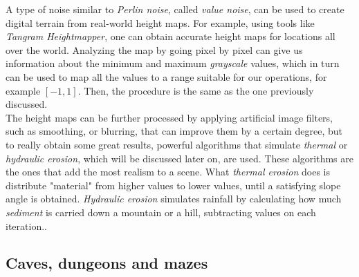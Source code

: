 A type of noise similar to \textit{Perlin noise}, called \textit{value noise}, can be used to create digital terrain from real-world height maps. For example, using tools like \textit{Tangram Heightmapper}, one can obtain accurate height maps for locations all over the world. Analyzing the map by going pixel by pixel can give us information about the minimum and maximum \textit{grayscale} values, which in turn can be used to map all the values to a range suitable for our operations, for example \([-1, 1]\). Then, the procedure is the same as the one previously discussed\cite{parberry2014designer}.\\

The height maps can be further processed by applying artificial image filters, such as smoothing, or blurring, that can improve them by a certain degree, but to really obtain some great results, powerful algorithms that simulate \textit{thermal} or \textit{hydraulic erosion}, which will be discussed later on, are used. These algorithms are the ones that add the most realism to a scene. What \textit{thermal erosion} does is distribute "material" from higher values to lower values, until a satisfying slope angle is obtained. \textit{Hydraulic erosion} simulates rainfall by calculating how much \textit{sediment} is carried down a mountain or a hill, subtracting values on each iteration.\cite{smelik2009survey}. 

\subsection{Caves, dungeons and mazes}

